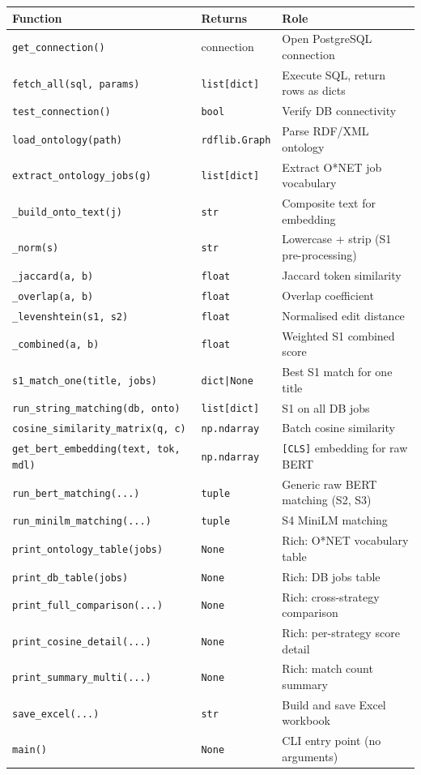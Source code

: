 ﻿\documentclass[12pt,a4paper]{article}
\begin{document}
\begin{longtable}{@{}P{6.5cm}P{3cm}P{5.5cm}@{}}
\toprule
\textbf{Function} & \textbf{Returns} & \textbf{Role} \\
\midrule
\endhead
\texttt{get\_connection()} & connection & Open PostgreSQL connection \\
\texttt{fetch\_all(sql, params)} & \texttt{list[dict]} & Execute SQL, return rows as dicts \\
\texttt{test\_connection()} & \texttt{bool} & Verify DB connectivity \\
\texttt{load\_ontology(path)} & \texttt{rdflib.Graph} & Parse RDF/XML ontology \\
\texttt{extract\_ontology\_jobs(g)} & \texttt{list[dict]} & Extract O*NET job vocabulary \\
\texttt{\_build\_onto\_text(j)} & \texttt{str} & Composite text for embedding \\
\texttt{\_norm(s)} & \texttt{str} & Lowercase + strip (S1 pre-processing) \\
\texttt{\_jaccard(a, b)} & \texttt{float} & Jaccard token similarity \\
\texttt{\_overlap(a, b)} & \texttt{float} & Overlap coefficient \\
\texttt{\_levenshtein(s1, s2)} & \texttt{float} & Normalised edit distance \\
\texttt{\_combined(a, b)} & \texttt{float} & Weighted S1 combined score \\
\texttt{s1\_match\_one(title, jobs)} & \texttt{dict|None} & Best S1 match for one title \\
\texttt{run\_string\_matching(db, onto)} & \texttt{list[dict]} & S1 on all DB jobs \\
\texttt{cosine\_similarity\_matrix(q, c)} & \texttt{np.ndarray} & Batch cosine similarity \\
\texttt{get\_bert\_embedding(text, tok, mdl)} & \texttt{np.ndarray} & \texttt{[CLS]} embedding for raw BERT \\
\texttt{run\_bert\_matching(...)} & \texttt{tuple} & Generic raw BERT matching (S2, S3) \\
\texttt{run\_minilm\_matching(...)} & \texttt{tuple} & S4 MiniLM matching \\
\texttt{print\_ontology\_table(jobs)} & \texttt{None} & Rich: O*NET vocabulary table \\
\texttt{print\_db\_table(jobs)} & \texttt{None} & Rich: DB jobs table \\
\texttt{print\_full\_comparison(...)} & \texttt{None} & Rich: cross-strategy comparison \\
\texttt{print\_cosine\_detail(...)} & \texttt{None} & Rich: per-strategy score detail \\
\texttt{print\_summary\_multi(...)} & \texttt{None} & Rich: match count summary \\
\texttt{save\_excel(...)} & \texttt{str} & Build and save Excel workbook \\
\texttt{main()} & \texttt{None} & CLI entry point (no arguments) \\
\bottomrule
\end{longtable}
\end{document}
